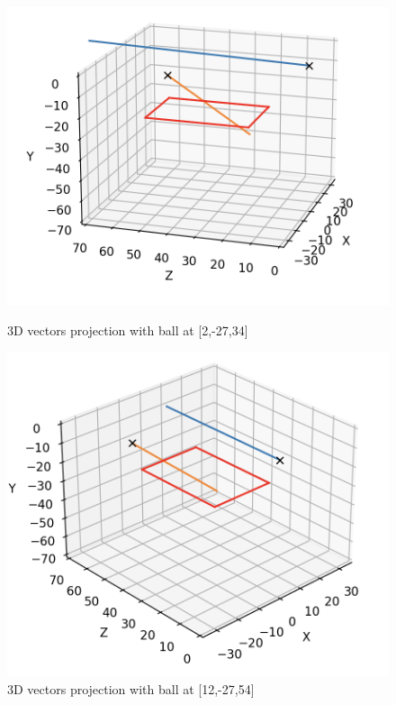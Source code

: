 \documentclass{article}
\begin{document}
\begin{figure}[h!] 
  \label{fig7} 
  \begin{minipage}[b]{0.5\linewidth}
    \centering
    \includegraphics[width=.2\textheight]{111.png} 
    \caption{\label{fig:111}3D vectors projection with ball at [2,-27,34]} 
    \vspace{4ex}
  \end{minipage}%
  \begin{minipage}[b]{0.5\linewidth}
    \centering
    \includegraphics[width=.2\textheight]{222.png} 
    \caption{\label{fig:222}3D vectors projection with ball at [12,-27,54]} 

\end{minipage}
\end{figure}
\end{document}
